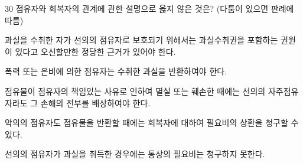 \begin{question}{30}
점유자와 회복자의 관계에 관한 설명으로 옳지 않은 것은? (다툼이 있으면 판례에 따름)
\begin{choices}
  \item 과실을 수취한 자가 선의의 점유자로 보호되기 위해서는 과실수취권을 포함하는 권원이 있다고 오신할만한 정당한 근거가 있어야 한다.
  \item 폭력 또는 은비에 의한 점유자는 수취한 과실을 반환하여야 한다.
  \item 점유물이 점유자의 책임있는 사유로 인하여 멸실 또는 훼손한 때에는 선의의 자주점유자라도 그 손해의 전부를 배상하여야 한다.
  \item 악의의 점유자도 점유물을 반환할 때에는 회복자에 대하여 필요비의 상환을 청구할 수 있다.
  \item 선의의 점유자가 과실을 취득한 경우에는 통상의 필요비는 청구하지 못한다.
\end{choices}
\end{question}
